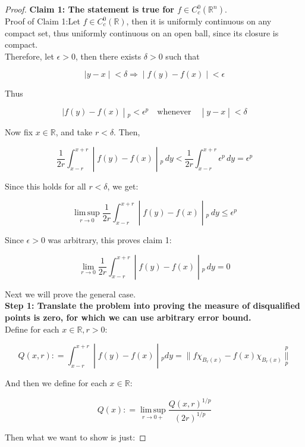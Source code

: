 \documentclass{qlnotes-export}
\begin{document}
\begin{proof}

\textbf{Claim 1: The statement is true for \(f \in C_{c}^{0}({\mathbb{R}}^{n})\)}.\\
Proof of Claim 1:Let \(f \in C_{c}^{0}({\mathbb{R}})\), then it is uniformly continuous on any compact set, thus uniformly continuous on an open ball, since its closure is compact.\\
Therefore, let \(\epsilon > 0\), then there exists \(\delta > 0\) such that

\[\left. |y - x \middle| < \delta\Longrightarrow \middle| f(y) - f(x) \middle| < \epsilon \right.\]

Thus

\[\left. |f(y) - f(x) \middle| {}_{p} < \epsilon^{p}\quad\text{whenever}\quad \middle| y - x \middle| < \delta \right.\]

Now fix \(x \in {\mathbb{R}}\), and take \(r < \delta\). Then,

\[\left. \frac{1}{2r}\int_{x - r}^{x + r} \middle| f(y) - f(x) \middle| {}_{p}\, dy < \frac{1}{2r}\int_{x - r}^{x + r}\epsilon^{p}\, dy = \epsilon^{p} \right.\]

Since this holds for all \(r < \delta\), we get:

\[\left. \operatorname{lim\, sup}\limits_{r\rightarrow 0}\frac{1}{2r}\int_{x - r}^{x + r} \middle| f(y) - f(x) \middle| {}_{p}\, dy \leq \epsilon^{p} \right.\]

Since \(\epsilon > 0\) was arbitrary, this proves claim 1:

\[\left. \lim\limits_{r\rightarrow 0}\frac{1}{2r}\int_{x - r}^{x + r} \middle| f(y) - f(x) \middle| {}_{p}\, dy = 0 \right.\]

Next we will prove the general case.\\
\textbf{Step 1: Translate the problem into proving the measure of disqualified points is zero, for which we can use arbitrary error bound.}\\
Define for each \(x \in {\mathbb{R}},r > 0\):

\[\left. Q(x,r): = \int_{x - r}^{x + r} \middle| f(y) - f(x) \middle| {}_{p} dy = \parallel f\chi_{B_{r}(x)} - f(x)\chi_{B_{r}(x)}\underset{p}{\overset{p}{\parallel}} \right.\]

And then we define for each \(x \in {\mathbb{R}}\):

\[Q(x): = \operatorname{lim\, sup}\limits_{r\rightarrow 0 +}\frac{Q(x,r)^{1/p}}{(2r)^{1/p}}\]

Then what we want to show is just:


\end{proof}
\end{document}

